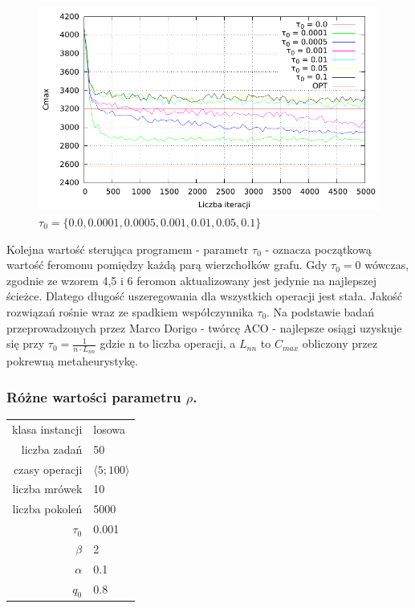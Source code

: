 \documentclass[10pt,a4paper]{article}
\begin{document}
\begin{figure}[h]
    \centering
    \includegraphics{./figures/inst_01_rnd_phinit_smooth.pdf}
    \caption{$ \tau_0 = \{ 0.0, 0.0001, 0.0005, 0.001, 0.01, 0.05, 0.1 \} $}
\end{figure}
\vspace{15mm}
Kolejna wartość sterująca programem - parametr $\tau_0$ - oznacza początkową wartość feromonu pomiędzy każdą parą wierzchołków grafu. Gdy $\tau_0 = 0$ wówczas, zgodnie ze wzorem 4,5 i 6 feromon aktualizowany jest jedynie na najlepszej ścieżce. Dlatego długość uszeregowania dla wszystkich operacji jest stała.
Jakość rozwiązań rośnie wraz ze spadkiem współczynnika $\tau_0$.
Na podstawie badań przeprowadzonych przez Marco Dorigo - twórcę ACO - najlepsze osiągi uzyskuje się przy $\tau_0 = \frac{1}{n \cdot L_{nn}}$ gdzie n to liczba operacji, a $L_{nn}$ to $C_{max}$ obliczony przez pokrewną metaheurystykę.



\newpage
\subsubsection{Różne wartości parametru $\rho$.}
\vspace{6 mm}
\begin{center}
\begin{tabular}{|r|l|}
  \hline
  klasa instancji & losowa \\
  liczba zadań & 50 \\
  czasy operacji & $ \langle 5;100 \rangle $  \\
  liczba mrówek & 10 \\
  liczba pokoleń & 5000 \\
  $ \tau_0 $ & 0.001 \\
  $ \beta $ & 2 \\
  $ \alpha $ & 0.1 \\
  $ q_0 $ & 0.8 \\
  \hline
\end{tabular}
\end{center}
\end{document}
